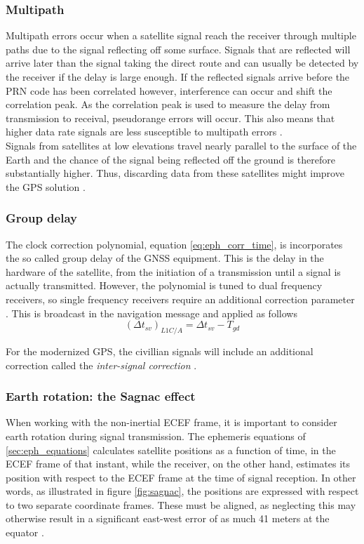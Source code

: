 \subsubsection{Multipath}
\label{sec:multipath}
Multipath errors occur when a satellite signal reach the receiver through multiple paths due to the signal reflecting off some surface. Signals that are reflected will arrive later than the signal taking the direct route and can usually be detected by the receiver if the delay is large enough. If the reflected signals arrive before the PRN code has been correlated however, interference can occur and shift the correlation peak. As the correlation peak is used to measure the delay from transmission to receival, pseudorange errors will occur. This also means that higher data rate signals are less susceptible to multipath errors \cite{groves2013principles}. \\

Signals from satellites at low elevations travel nearly parallel to the surface of the Earth and the chance of the signal being reflected off the ground is therefore substantially higher. Thus, discarding data from these satellites might improve the GPS solution \cite{farrell2008aided, groves2013principles}.

\subsubsection{Group delay}
The clock correction polynomial, equation \ref{eq:eph_corr_time}, is incorporates the so called group delay of the GNSS equipment. This is the delay in the hardware of the satellite, from the initiation of a transmission until a signal is actually transmitted. However, the polynomial is tuned to dual frequency receivers, so single frequency receivers require an additional correction parameter \cite{spec:gps}. This is broadcast in the navigation message and applied as follows
\begin{equation}
    (\Delta t_{sv})_{L1C/A} = \Delta t_{sv} - T_{gd}
\end{equation}

For the modernized GPS, the civillian signals will include an additional correction called the \textit{inter-signal correction} \cite{spec:gps-new}.


\subsubsection{Earth rotation: the Sagnac effect}
When working with the non-inertial ECEF frame, it is important to consider earth rotation during signal transmission. The ephemeris equations of \ref{sec:eph_equations} calculates satellite positions as a function of time, in the ECEF frame of that instant, while the receiver, on the other hand, estimates its position with respect to the ECEF frame at the time of signal reception. In other words, as illustrated in figure \ref{fig:sagnac}, the positions are expressed with respect to two separate coordinate frames. These must be aligned, as neglecting this may otherwise result in a significant east-west error of as much 41 meters at the equator \cite{groves2013principles}.\\

